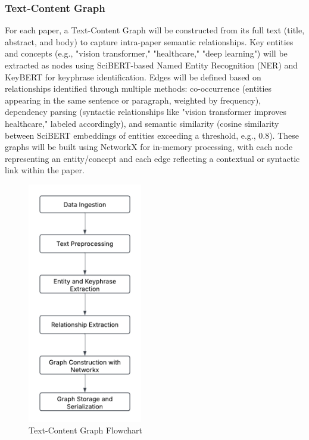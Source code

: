 \documentclass[a4paper,12pt]{article}
\begin{document}
\subsubsection{Text-Content Graph}
For each paper, a Text-Content Graph will be constructed from its full text
(title, abstract, and body) to capture intra-paper semantic relationships. Key
entities and concepts (e.g., "vision transformer," "healthcare," "deep learning")
will be extracted as nodes using SciBERT-based Named Entity Recognition (NER)
\parencite{beltagy2019scibertpretrainedlanguagemodel} and KeyBERT \parencite{10295108}
for keyphrase identification. Edges will be defined based on relationships
identified through multiple methods: co-occurrence (entities appearing in the
same sentence or paragraph, weighted by frequency), dependency parsing
(syntactic relationships like "vision transformer improves healthcare,"
labeled accordingly), and semantic similarity (cosine similarity between
SciBERT embeddings of entities exceeding a threshold, e.g., 0.8). These
graphs will be built using NetworkX for in-memory processing, with each node
representing an entity/concept and each edge reflecting a contextual or syntactic
link within the paper.
\begin{figure}[H]
    \centering
    \includegraphics[width=5cm]{textcontentgraphflowchart.png}
    \caption{Text-Content Graph Flowchart}
\end{figure}
\end{document}
